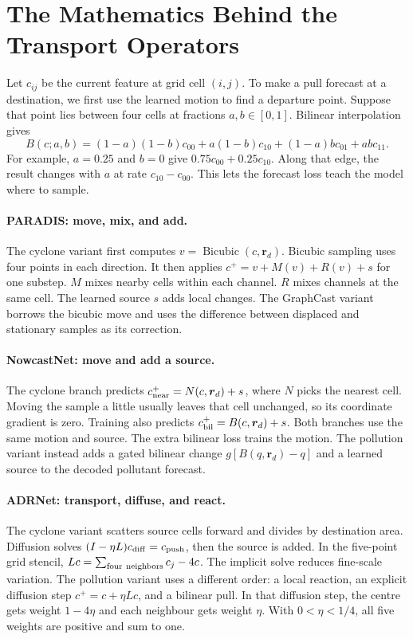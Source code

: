 \documentclass[10pt,a4paper]{article}
\begin{document}
\newpage
\section{The Mathematics Behind the Transport Operators}
Let \(c_{ij}\) be the current feature at grid cell \((i,j)\). To make a pull forecast at a destination, we first use the learned motion to find a departure point. Suppose that point lies between four cells at fractions \(a,b\in[0,1]\). Bilinear interpolation gives
\[
 B(c;a,b)=(1-a)(1-b)c_{00}+a(1-b)c_{10}+(1-a)bc_{01}+ab c_{11}.
\]
For example, \(a=0.25\) and \(b=0\) give \(0.75c_{00}+0.25c_{10}\). Along that edge, the result changes with \(a\) at rate \(c_{10}-c_{00}\). This lets the forecast loss teach the model where to sample.

\paragraph{PARADIS: move, mix, and add.}
The cyclone variant first computes \(v=\operatorname{Bicubic}(c,\boldsymbol r_d)\). Bicubic sampling uses four points in each direction. It then applies
\(c^+=v+M(v)+R(v)+s\) for one substep. \(M\) mixes nearby cells within each channel. \(R\) mixes channels at the same cell. The learned source \(s\) adds local changes. The GraphCast variant borrows the bicubic move and uses the difference between displaced and stationary samples as its correction.

\paragraph{NowcastNet: move and add a source.}
The cyclone branch predicts \(c^+_{\rm near}=N(c,\boldsymbol r_d)+s\), where \(N\) picks the nearest cell. Moving the sample a little usually leaves that cell unchanged, so its coordinate gradient is zero. Training also predicts \(c^+_{\rm bil}=B(c,\boldsymbol r_d)+s\). Both branches use the same motion and source. The extra bilinear loss trains the motion. The pollution variant instead adds a gated bilinear change \(g[B(q,\boldsymbol r_d)-q]\) and a learned source to the decoded pollutant forecast.

\paragraph{ADRNet: transport, diffuse, and react.}
The cyclone variant scatters source cells forward and divides by destination area. Diffusion solves \((I-\eta L)c_{\rm diff}=c_{\rm push}\), then the source is added. In the five-point grid stencil, \(Lc=\sum_{\rm four\ neighbors}c_j-4c\). The implicit solve reduces fine-scale variation. The pollution variant uses a different order: a local reaction, an explicit diffusion step \(c^+=c+\eta Lc\), and a bilinear pull. In that diffusion step, the centre gets weight \(1-4\eta\) and each neighbour gets weight \(\eta\). With \(0<\eta<1/4\), all five weights are positive and sum to one.
\end{document}

